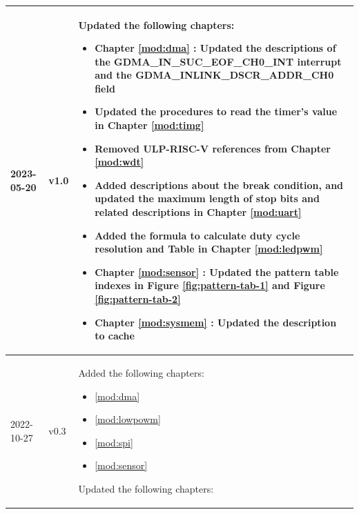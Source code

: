 \begin{longtable}[l]{ | m{2cm} | m{1.5cm} | m{12cm} | }
    2023-05-20 & v1.0 &
        Updated the following chapters:
            \begin{itemize}
                \item Chapter \ref{mod:dma} \textit{\nameref{mod:dma}}: Updated the descriptions of the GDMA\_IN\_SUC\_EOF\_CH0\_INT interrupt and the GDMA\_INLINK\_DSCR\_ADDR\_CH0 field %
                \item Updated the procedures to read the timer's value in Chapter \ref{mod:timg} \textit{\nameref{mod:timg}}  %
                \item Removed ULP-RISC-V references from Chapter \ref{mod:wdt} \textit{\nameref{mod:wdt}} %
                \item Added descriptions about the break condition, and updated the maximum length of stop bits and related descriptions in Chapter  \ref{mod:uart} \textit{\nameref{mod:uart}} %
                \item Added the formula to calculate duty cycle resolution and Table  \textit{\nameref{tab:ledc-common-freq-res}} in Chapter \ref{mod:ledpwm} \textit{\nameref{mod:ledpwm}} %
                \item Chapter \ref{mod:sensor} \textit{\nameref{mod:sensor}}: Updated the pattern table indexes in Figure \ref{fig:pattern-tab-1} and Figure \ref{fig:pattern-tab-2}
                \item Chapter \ref{mod:sysmem} \textit{\nameref{mod:sysmem}}: Updated the description to cache %
            \end{itemize}
 \\\hline
    2022-10-27 & v0.3 &
        Added the following chapters:
            \begin{itemize}
                \item \ref{mod:dma} \textit{\nameref{mod:dma}}
                \item \ref{mod:lowpowm} \textit{\nameref{mod:lowpowm}}
                \item \ref{mod:spi} \textit{\nameref{mod:spi}}
                \item \ref{mod:sensor} \textit{\nameref{mod:sensor}}
            \end{itemize}
        Updated the following chapters:
            \begin{itemize}

\end{itemize}
\end{longtable}
